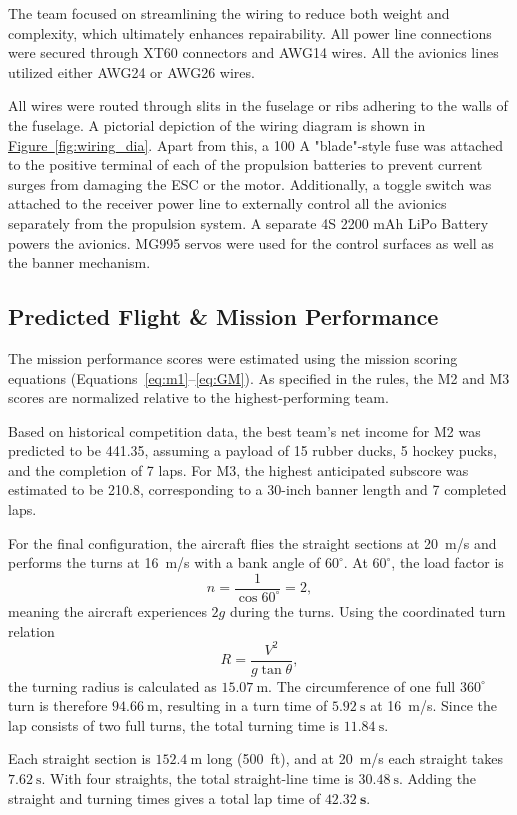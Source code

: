 \documentclass[10pt, letterpaper]{article}
\begin{document}
The team focused on streamlining the wiring to reduce both weight and complexity, which ultimately enhances repairability. All power line connections were secured through XT60 connectors and AWG14 wires. All the avionics lines utilized either AWG24 or AWG26 wires.

All wires were routed through slits in the fuselage or ribs adhering to the walls of the fuselage. A pictorial depiction of the wiring diagram is shown in \hyperref[fig:wiring_dia]{Figure~\ref*{fig:wiring_dia}}. Apart from this, a 100 A "blade"-style fuse was attached to the positive terminal of each of the propulsion batteries to prevent current surges from damaging the ESC or the motor. Additionally, a toggle switch was attached to the receiver power line to externally control all the avionics separately from the propulsion system. A separate 4S 2200 mAh LiPo Battery powers the avionics. MG995 servos were used for the control surfaces as well as the banner mechanism. 


\subsection{Predicted Flight \& Mission Performance}
The mission performance scores were estimated using the mission scoring equations (Equations~\ref{eq:m1}--\ref{eq:GM}). As specified in the rules, the M2 and M3 scores are normalized relative to the highest-performing team.

Based on historical competition data, the best team’s net income for M2 was predicted to be 441.35, assuming a payload of 15 rubber ducks, 5 hockey pucks, and the completion of 7 laps. For M3, the highest anticipated subscore was estimated to be 210.8, corresponding to a 30-inch banner length and 7 completed laps.

For the final configuration, the aircraft flies the straight sections at 20~m/s and performs the turns at 16~m/s with a bank angle of $60^\circ$. At $60^\circ$, the load factor is 
\[
n = \frac{1}{\cos 60^\circ} = 2,
\]
meaning the aircraft experiences $2g$ during the turns. Using the coordinated turn relation
\[
R = \frac{V^2}{g \tan \theta},
\]
the turning radius is calculated as $15.07~\text{m}$. The circumference of one full $360^\circ$ turn is therefore $94.66~\text{m}$, resulting in a turn time of $5.92~\text{s}$ at 16~m/s. Since the lap consists of two full turns, the total turning time is $11.84~\text{s}$. 

Each straight section is $152.4~\text{m}$ long (500~ft), and at 20~m/s each straight takes $7.62~\text{s}$. With four straights, the total straight-line time is $30.48~\text{s}$. Adding the straight and turning times gives a total lap time of $\mathbf{42.32~\text{s}}$.
\end{document}
